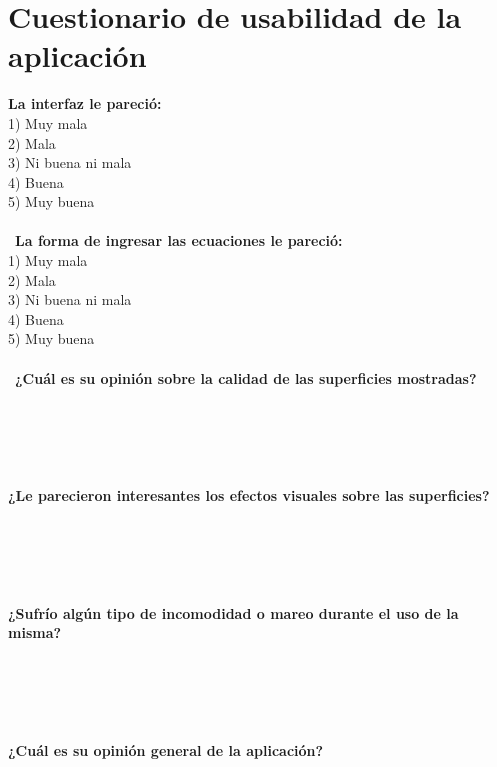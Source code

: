 \documentclass[12pt]{article}
\begin{document}
\section{Cuestionario de usabilidad de la aplicación}
\textbf{La interfaz le pareció:}
\\ 1) Muy mala
\\ 2) Mala
\\ 3) Ni buena ni mala
\\ 4) Buena
\\ 5) Muy buena
\\\\\
\textbf{La forma de ingresar las ecuaciones le pareció:}
\\ 1) Muy mala
\\ 2) Mala
\\ 3) Ni buena ni mala
\\ 4) Buena
\\ 5) Muy buena
\\\\\
\textbf{¿Cuál es su opinión sobre la calidad de las superficies mostradas?}
\\\\\\\\\\\\
\textbf{¿Le parecieron interesantes los efectos visuales sobre las superficies?}
\\\\\\\\\\\\
\textbf{¿Sufrío algún tipo de incomodidad o mareo durante el uso de la misma?}
\\\\\\\\\\\\
\textbf{¿Cuál es su opinión general de la aplicación?}
\clearpage
\null\newpage
\end{document}
